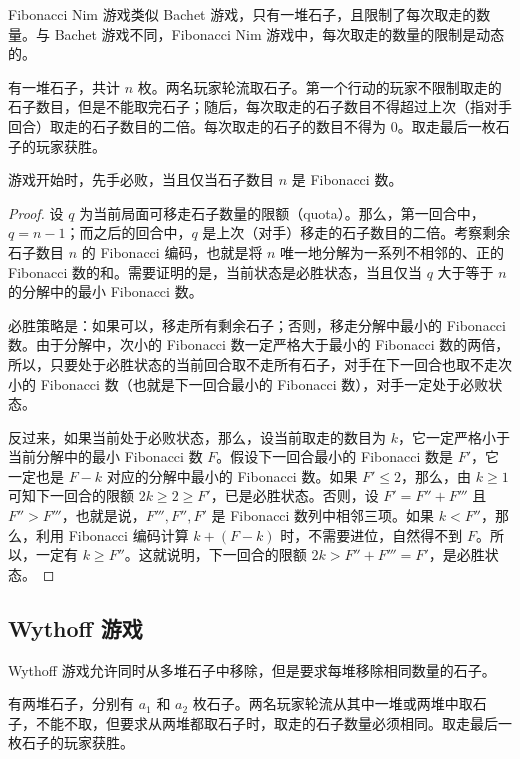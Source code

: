 Fibonacci Nim 游戏类似 Bachet 游戏，只有一堆石子，且限制了每次取走的数量。与 Bachet 游戏不同，Fibonacci Nim 游戏中，每次取走的数量的限制是动态的。

\begin{game}
	有一堆石子，共计 $n$ 枚。两名玩家轮流取石子。第一个行动的玩家不限制取走的石子数目，但是不能取完石子；随后，每次取走的石子数目不得超过上次（指对手回合）取走的石子数目的二倍。每次取走的石子的数目不得为 $0$。取走最后一枚石子的玩家获胜。
\end{game}

\begin{theorem}
	游戏开始时，先手必败，当且仅当石子数目 $n$ 是 Fibonacci 数。
\end{theorem}

\begin{proof}
	设 $q$ 为当前局面可移走石子数量的限额（quota）。那么，第一回合中，$q=n-1$；而之后的回合中，$q$ 是上次（对手）移走的石子数目的二倍。考察剩余石子数目 $n$ 的 Fibonacci 编码，也就是将 $n$ 唯一地分解为一系列不相邻的、正的 Fibonacci 数的和。需要证明的是，当前状态是必胜状态，当且仅当 $q$ 大于等于 $n$ 的分解中的最小 Fibonacci 数。
	
	必胜策略是：如果可以，移走所有剩余石子；否则，移走分解中最小的 Fibonacci 数。由于分解中，次小的 Fibonacci 数一定严格大于最小的 Fibonacci 数的两倍，所以，只要处于必胜状态的当前回合取不走所有石子，对手在下一回合也取不走次小的 Fibonacci 数（也就是下一回合最小的 Fibonacci 数），对手一定处于必败状态。
	
	反过来，如果当前处于必败状态，那么，设当前取走的数目为 $k$，它一定严格小于当前分解中的最小 Fibonacci 数 $F$。假设下一回合最小的 Fibonacci 数是 $F'$，它一定也是 $F - k$ 对应的分解中最小的 Fibonacci 数。如果 $F'\le 2$，那么，由 $k\ge 1$ 可知下一回合的限额 $2k\ge 2\ge F'$，已是必胜状态。否则，设 $F'=F''+F'''$ 且 $F''>F'''$，也就是说，$F''',F'',F'$ 是 Fibonacci 数列中相邻三项。如果 $k<F''$，那么，利用 Fibonacci 编码计算 $k + (F-k)$ 时，不需要进位，自然得不到 $F$。所以，一定有 $k\ge F''$。这就说明，下一回合的限额 $2k>F''+F'''=F'$，是必胜状态。
\end{proof}

\newpage

\subsection{Wythoff 游戏}

Wythoff 游戏允许同时从多堆石子中移除，但是要求每堆移除相同数量的石子。

\begin{game}[Wythoff]
	有两堆石子，分别有 $a_1$ 和 $a_2$ 枚石子。两名玩家轮流从其中一堆或两堆中取石子，不能不取，但要求从两堆都取石子时，取走的石子数量必须相同。取走最后一枚石子的玩家获胜。
\end{game}


